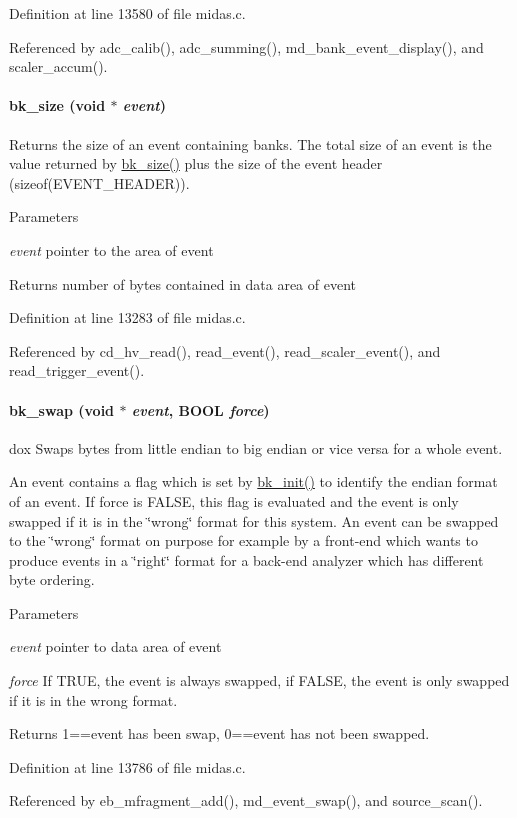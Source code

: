 Definition at line 13580 of file midas.c.

Referenced by adc\_\-calib(), adc\_\-summing(), md\_\-bank\_\-event\_\-display(), and scaler\_\-accum().
\paragraph[{bk\_\-size}]{ bk\_\-size (void $\ast$ {\em event})}\hfill\label{group__bkfunctionc_ga8fc93de36e62c4328cb6581be7f42a0f}
Returns the size of an event containing banks. The total size of an event is the value returned by \hyperlink{group__bkfunctionc_ga8fc93de36e62c4328cb6581be7f42a0f}{bk\_\-size()} plus the size of the event header (sizeof(EVENT\_\-HEADER)). 
\begin{DoxyParams}{Parameters}
\item[{\em event}]pointer to the area of event \end{DoxyParams}
\begin{DoxyReturn}{Returns}
number of bytes contained in data area of event 
\end{DoxyReturn}


Definition at line 13283 of file midas.c.

Referenced by cd\_\-hv\_\-read(), read\_\-event(), read\_\-scaler\_\-event(), and read\_\-trigger\_\-event().
\paragraph[{bk\_\-swap}]{ bk\_\-swap (void $\ast$ {\em event}, \/  {\bf BOOL} {\em force})}\hfill\label{group__bkfunctionc_ga44b7381af9b91fbdf2f6d59f55451ea1}
dox Swaps bytes from little endian to big endian or vice versa for a whole event.

An event contains a flag which is set by \hyperlink{group__bkfunctionc_gac6fadde40824dbf7bd70abedd29be2bd}{bk\_\-init()} to identify the endian format of an event. If force is FALSE, this flag is evaluated and the event is only swapped if it is in the \char`\"{}wrong\char`\"{} format for this system. An event can be swapped to the \char`\"{}wrong\char`\"{} format on purpose for example by a front-\/end which wants to produce events in a \char`\"{}right\char`\"{} format for a back-\/end analyzer which has different byte ordering. 
\begin{DoxyParams}{Parameters}
\item[{\em event}]pointer to data area of event \item[{\em force}]If TRUE, the event is always swapped, if FALSE, the event is only swapped if it is in the wrong format. \end{DoxyParams}
\begin{DoxyReturn}{Returns}
1==event has been swap, 0==event has not been swapped. 
\end{DoxyReturn}


Definition at line 13786 of file midas.c.

Referenced by eb\_\-mfragment\_\-add(), md\_\-event\_\-swap(), and source\_\-scan().